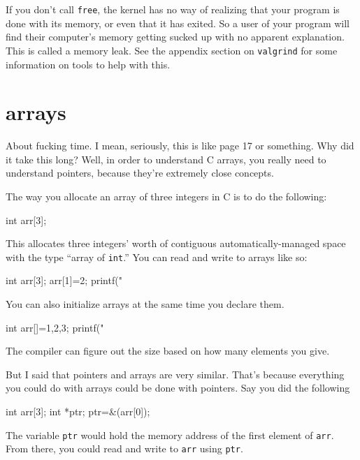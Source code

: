 \documentclass[ebook,11pt,oneside,openany]{memoir}
\newcommand{\cf}[1]{\texttt{#1}}
\begin{document}
If you don't call \texttt{free}, the kernel has no way of realizing that your program is done with its memory, or even that it has exited. So a user of your program will find their computer's memory getting sucked up with no apparent explanation. This is called a memory leak. See the appendix section on \texttt{valgrind} for some information on tools to help with this.

\section{arrays}

About fucking time. I mean, seriously, this is like page 17 or something. Why did it take this long? Well, in order to understand C arrays, you really need to understand pointers, because they're extremely close concepts.

The way you allocate an array of three integers in C is to do the following:

\begin{code}[language=C]
int arr[3];
\end{code}

This allocates three integers' worth of contiguous automatically-managed space with the type ``array of \cf{int}.'' You can read and write to arrays like so:

\begin{code}[language=C]
int arr[3];
arr[1]=2;
printf("%
\end{code}

\noindent
You can also initialize arrays at the same time you declare them.

\begin{code}[language=C]
int arr[]={1,2,3};
printf("%
\end{code}

\noindent
The compiler can figure out the size based on how many elements you give.

But I said that pointers and arrays are very similar. That's because everything you could do with arrays could be done with pointers. Say you did the following 

\begin{code}[language=C]
int arr[3];
int *ptr;
ptr=&(arr[0]);
\end{code}

The variable \cf{ptr} would hold the memory address of the first element of \cf{arr}. From there, you could read and write to \cf{arr} using \cf{ptr}.
\end{document}
